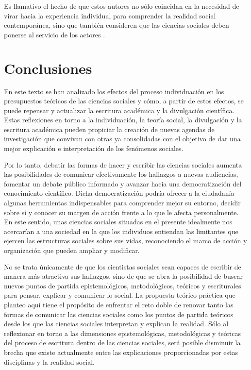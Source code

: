 \documentclass[
  spanish,
  11pt,
  a4paper,
]{scrbook}
\begin{document}
Es llamativo el hecho de que estos autores no sólo coincidan en la
necesidad de virar hacia la experiencia individual para comprender la
realidad social contemporánea, sino que también consideren que las
ciencias sociales deben ponerse al servicio de los actores
\autocites[XI]{Bajoit2008}[165-168]{Martuccelli2017}.

\section*{Conclusiones}\label{conclusiones-1}


En este texto se han analizado los efectos del proceso individuación en
los presupuestos teóricos de las ciencias sociales y cómo, a partir de
estos efectos, se puede repensar y actualizar la escritura académica y
la divulgación científica. Estas reflexiones en torno a la
individuación, la teoría social, la divulgación y la escritura académica
pueden propiciar la creación de nuevas agendas de investigación que
convivan con otras ya consolidadas con el objetivo de dar una mejor
explicación e interpretación de los fenómenos sociales.

Por lo tanto, debatir las formas de hacer y escribir las ciencias
sociales aumenta las posibilidades de comunicar efectivamente los
hallazgos a nuevas audiencias, fomentar un debate público informado y
avanzar hacia una democratización del conocimiento científico. Dicha
democratización podría ofrecer a la ciudadanía algunas herramientas
indispensables para comprender mejor su entorno, decidir sobre sí y
conocer su margen de acción frente a lo que le afecta personalmente. En
este sentido, unas ciencias sociales situadas en el presente idealmente
nos acercarían a una sociedad en la que los individuos entiendan las
limitantes que ejercen las estructuras sociales sobre sus vidas,
reconociendo el marco de acción y organización que pueden ampliar y
modificar.

No se trata únicamente de que los cientistas sociales sean capaces de
escribir de manera más atractiva sus hallazgos, sino de que se abra la
posibilidad de buscar nuevos puntos de partida epistemológicos,
metodológicos, teóricos y escriturales para pensar, explicar y comunicar
lo social. La propuesta teórico-práctica que planteo aquí tiene el
propósito de enfrentar el reto doble de renovar tanto las formas de
comunicar las ciencias sociales como los puntos de partida teóricos
desde los que las ciencias sociales interpretan y explican la realidad.
Sólo al reflexionar en torno a las dimensiones epistemológicas,
metodológicas y teóricas del proceso de escritura dentro de las ciencias
sociales, será posible disminuir la brecha que existe actualmente entre
las explicaciones proporcionadas por estas disciplinas y la realidad
social.
\end{document}
